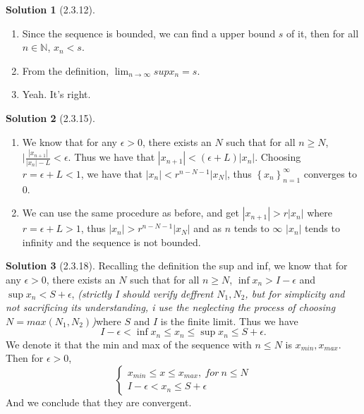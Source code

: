 \documentclass{article}
\theoremstyle{definition}
\newtheorem{sol}{Solution}[exe]
\begin{document}
\begin{sol}[2.3.12]
\begin{enumerate}[label=\alph*]
\item Since the sequence is bounded, we can find a upper bound $s$ of it, then for all $n\in\mathbb{N}$, $x_{n}<s$.
\item From the definition, $\lim_{n\to\infty}sup x_{n}=s$.
\item Yeah. It's right.
\end{enumerate}
\end{sol}


\begin{sol}[2.3.15]
\begin{enumerate}[label=\alph*]
\item We know that for any $\epsilon>0$, there exists an $N$ such that for all $n\geq N$, $|\frac{|x_{n+1}|}{|x_{n}|-L}<\epsilon$.
Thus we have that $|x_{n+1}|<(\epsilon+L)|x_{n}|$. Choosing $r=\epsilon+L<1$, we have that $|x_{n}|<r^{n-N-1}|x_{N}|$, thus $\left\{x_{n}\right\}_{n=1}^{\infty}$ converges to 0.
\item We can use the same procedure as before, and get $|x_{n+1}|>r|x_{n}|$ where $r=\epsilon+L>1$, thus $|x_{n}|>r^{n-N-1}|x_{N}|$ and as $n$ tends to $\infty$ $|x_{n}|$ tends to infinity and the sequence is not bounded.
\end{enumerate}    
\end{sol}


\begin{sol}[2.3.18]

Recalling the definition the sup and inf, we know that for any $\epsilon>0$, there exists an $N$ such that for all $n\geq N$, $\inf x_{n}> I-\epsilon$ and $\sup x_{n}< S+\epsilon$, \textit{(strictly I should verify deffrent $N_{1},N_{2}$, but for simplicity and not sacrificing its understanding, i use the neglecting the process of choosing $N=max(N_{1},N_{2})$)}where $S$ and $I$ is the finite limit.
Thus we have $$ I-\epsilon<\inf x_{n}\leq x_{n}\leq \sup x_{n}\leq S+\epsilon.$$
We denote it that the min and max of the sequence with $n\leq N$ is $x_{min},x_{max}$. Then for $\epsilon>0$, 
$$
\begin{cases}
    x_{min}\leq x\leq x_{max},\ for\ n\leq N\\
    I-\epsilon<x_{n}\leq S+\epsilon
\end{cases}
$$
And we conclude that they are convergent.
\end{sol}
\end{document}
